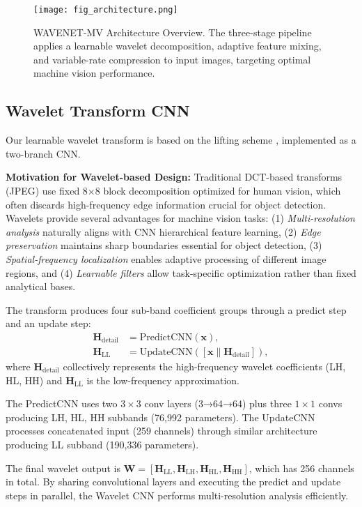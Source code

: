 \documentclass[conference]{IEEEtran}
\begin{document}
\begin{figure}[htbp]
\centering
\texttt{[image: fig\_architecture.png]}
\caption{WAVENET-MV Architecture Overview. The three-stage pipeline applies a learnable wavelet decomposition, adaptive feature mixing, and variable-rate compression to input images, targeting optimal machine vision performance.}
\label{fig:architecture}
\end{figure}

\subsection{Wavelet Transform CNN}

Our learnable wavelet transform is based on the lifting scheme \cite{daubechies1998factoring}, implemented as a two-branch CNN. 

\textbf{Motivation for Wavelet-based Design:} Traditional DCT-based transforms (JPEG) use fixed 8×8 block decomposition optimized for human vision, which often discards high-frequency edge information crucial for object detection. Wavelets provide several advantages for machine vision tasks: (1) \textit{Multi-resolution analysis} naturally aligns with CNN hierarchical feature learning, (2) \textit{Edge preservation} maintains sharp boundaries essential for object detection, (3) \textit{Spatial-frequency localization} enables adaptive processing of different image regions, and (4) \textit{Learnable filters} allow task-specific optimization rather than fixed analytical bases.

The transform produces four sub-band coefficient groups through a predict step and an update step:
\begin{align}
\mathbf{H}_{\text{detail}} &= \text{PredictCNN}(\mathbf{x}), \\
\mathbf{H}_{\text{LL}} &= \text{UpdateCNN}([\mathbf{x} \| \mathbf{H}_{\text{detail}}]),
\end{align}
where $\mathbf{H}_{\text{detail}}$ collectively represents the high-frequency wavelet coefficients (LH, HL, HH) and $\mathbf{H}_{\text{LL}}$ is the low-frequency approximation.

The PredictCNN uses two $3\times3$ conv layers (3→64→64) plus three $1\times1$ convs producing LH, HL, HH subbands (76,992 parameters). The UpdateCNN processes concatenated input (259 channels) through similar architecture producing LL subband (190,336 parameters).

The final wavelet output is $\mathbf{W} = [\mathbf{H}_{\text{LL}}, \mathbf{H}_{\text{LH}}, \mathbf{H}_{\text{HL}}, \mathbf{H}_{\text{HH}}]$, which has 256 channels in total. By sharing convolutional layers and executing the predict and update steps in parallel, the Wavelet CNN performs multi-resolution analysis efficiently.
\end{document}
